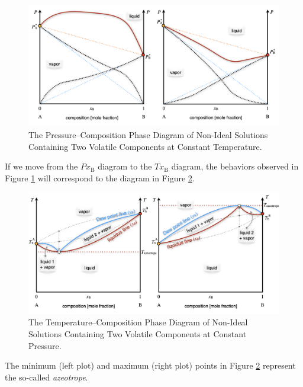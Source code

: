 \documentclass[
  9pt,
]{extbook}
\theoremstyle{definition}
\theoremstyle{definition}
\theoremstyle{definition}
\theoremstyle{remark}
\begin{document}
\begin{figure}

{\centering \includegraphics[width=0.8\linewidth]{./img/OEP_Figures.025} 

}

\caption{The Pressure–Composition Phase Diagram of Non-Ideal Solutions Containing Two Volatile Components at Constant Temperature.}\label{fig:FigMC7}
\end{figure}

If we move from the \(Px_{\text{B}}\) diagram to the \(Tx_{\text{B}}\) diagram, the behaviors observed in Figure \ref{fig:FigMC7} will correspond to the diagram in Figure \ref{fig:FigMC8}.

\begin{figure}

{\centering \includegraphics[width=0.8\linewidth]{./img/OEP_Figures.026} 

}

\caption{The Temperature–Composition Phase Diagram of Non-Ideal Solutions Containing Two Volatile Components at Constant Pressure.}\label{fig:FigMC8}
\end{figure}

The minimum (left plot) and maximum (right plot) points in Figure \ref{fig:FigMC8} represent the so-called \emph{azeotrope}.
\end{document}

